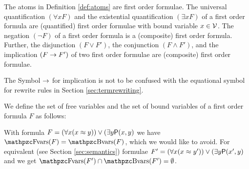 
\begin{definition}\label{def:syntax:FOF}
	The atoms in Definition \vref{def:atoms} are {\myem first order formulae}.
	The universal quantification $(\forall x F)$
	and the existential quantification $(\exists x F)$
	of a first order formula are (quantified) first order formulae
	with {\myem bound} variable $x\in\mathcal{V}$.
	The negation $(\lnot F)$ of a first order formula
	is a (composite) first order formula.
	Further, the disjunction $(F \lor F')$,
	the conjunction $(F \land F') $,
	and the implication $(F \rightarrow F')$
	of two first order formulae
	are (composite) first order formulae.
\end{definition}

\begin{remark}
	The Symbol $\rightarrow$ for implication is not to be confused
	with the equational symbol for rewrite rules in Section \ref{sec:termrewriting}.
\end{remark}

\begin{definition}\label{def:fof:fvars}\label{def:fof:bvars}
	We define the set of {\myem free} variables and the set of {\myem bound} variables
	of a first order formula $F$ as follows:
\end{definition}

\begin{example}
	With formula $F = (\forall x (x\approx y)) \lor (\exists y \mathsf{P}(x,y)$
	we have $\fvar(F) = \bvar(F)$, which we would like to avoid.
	For equivalent (see Section \vref{sec:semantics}) formulae
	$F' = (\forall x (x\approx y')) \lor (\exists y \mathsf{P}(x',y)$
	and we get
	$\fvar(F') \cap \bvar(F') = \emptyset$.
\end{example}

